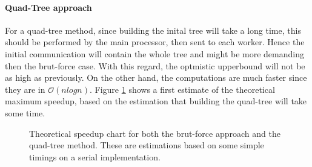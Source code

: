 \paragraph{Quad-Tree approach}
For a quad-tree method, since building the inital tree will take a long time, this should be performed by the main processor, then sent to each worker. Hence the initial communication will contain the whole tree and might be more demanding then the brut-force case. With this regard, the optmistic upperbound will not be as high as previously. On the other hand, the computations are much faster since they are in $\mathcal{O}(nlogn)$. Figure \ref{fig:th_su} shows a first estimate of the theoretical maximum speedup, based on the estimation that building the quad-tree will take some time. 
\begin{figure}[H]

\caption{Theoretical speedup chart for both the brut-force approach and the quad-tree method. These are estimations based on some simple timings on a serial implementation.}
\label{fig:th_su}
\end{figure}


